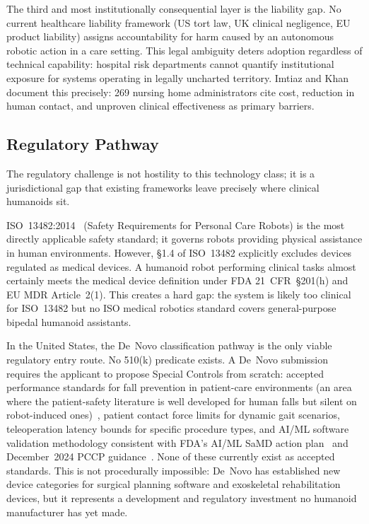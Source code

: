 \documentclass[acmsmall]{acmart}
\begin{document}
The third and most institutionally consequential layer is the liability gap. No
current healthcare liability framework (US tort law, UK clinical negligence, EU
product liability) assigns accountability for harm caused by an autonomous
robotic action in a care setting. This legal ambiguity deters adoption regardless
of technical capability: hospital risk departments cannot quantify institutional
exposure for systems operating in legally uncharted territory. Imtiaz and
Khan~\cite{imtiaz2024perceptions} document this precisely: 269 nursing home
administrators cite cost, reduction in human contact, and unproven clinical
effectiveness as primary barriers.

\subsection{Regulatory Pathway}
\label{sec:regulatory}

The regulatory challenge is not hostility to this technology class; it is a
jurisdictional gap that existing frameworks leave precisely where clinical
humanoids sit.

ISO~13482:2014~\cite{iso13482} (Safety Requirements for Personal Care Robots) is
the most directly applicable safety standard; it governs robots providing
physical assistance in human environments. However, \S{}1.4 of ISO~13482
explicitly excludes devices regulated as medical devices. A humanoid robot performing
clinical tasks almost certainly meets the medical device definition under FDA
21~CFR~\S{}201(h) and EU MDR Article~2(1). This creates a hard gap: the system
is likely too clinical for ISO~13482 but no ISO medical robotics standard covers
general-purpose bipedal humanoid assistants.

In the United States, the De~Novo classification pathway is the only viable
regulatory entry route. No 510(k) predicate exists. A De~Novo submission requires
the applicant to propose Special Controls from scratch: accepted performance
standards for fall prevention in patient-care environments (an area where the
patient-safety literature is well developed for human falls but silent on
robot-induced ones)~\cite{oliver2007strategies,cameron2012interventions}, patient
contact force limits for dynamic gait scenarios, teleoperation latency bounds for specific
procedure types, and AI/ML software validation methodology consistent with FDA's
AI/ML SaMD action plan~\cite{fda2021aiml} and December~2024 PCCP
guidance~\cite{fda2024pccp}. None of these currently exist as accepted standards. This is not procedurally
impossible: De~Novo has established new device categories for surgical planning
software and exoskeletal rehabilitation devices, but it represents a development
and regulatory investment no humanoid manufacturer has yet made.
\end{document}
